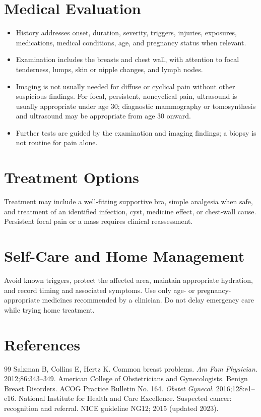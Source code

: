 \section*{Medical Evaluation}
\begin{itemize}
  \item History addresses onset, duration, severity, triggers, injuries, exposures, medications, medical conditions, age, and pregnancy status when relevant.
  \item Examination includes the breasts and chest wall, with attention to focal tenderness, lumps, skin or nipple changes, and lymph nodes.
  \item Imaging is not usually needed for diffuse or cyclical pain without other suspicious findings. For focal, persistent, noncyclical pain, ultrasound is usually appropriate under age 30; diagnostic mammography or tomosynthesis and ultrasound may be appropriate from age 30 onward.
  \item Further tests are guided by the examination and imaging findings; a biopsy is not routine for pain alone.
\end{itemize}

\section*{Treatment Options}
Treatment may include a well-fitting supportive bra, simple analgesia when safe, and treatment of an identified infection, cyst, medicine effect, or chest-wall cause. Persistent focal pain or a mass requires clinical reassessment.

\section*{Self-Care and Home Management}
Avoid known triggers, protect the affected area, maintain appropriate hydration, and record timing and associated symptoms. Use only age- or pregnancy-appropriate medicines recommended by a clinician. Do not delay emergency care while trying home treatment.

\section*{References}
\begin{thebibliography}{99}
 Salzman B, Collins E, Hertz K. Common breast problems. \textit{Am Fam Physician}. 2012;86:343--349.
 American College of Obstetricians and Gynecologists. Benign Breast Disorders. ACOG Practice Bulletin No. 164. \textit{Obstet Gynecol}. 2016;128:e1--e16.
 National Institute for Health and Care Excellence. Suspected cancer: recognition and referral. NICE guideline NG12; 2015 (updated 2023).
\end{thebibliography}
